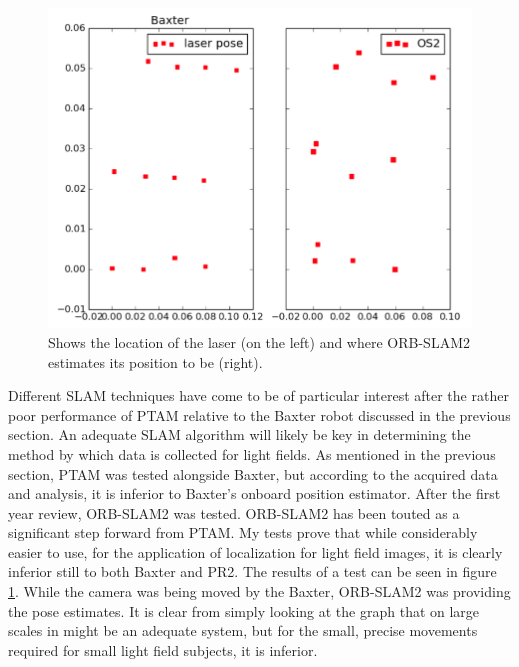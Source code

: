 \documentclass[12pt]{report}
\begin{document}
\begin{figure}[!ht]
	\centering
	\includegraphics[scale=0.45]{os2_and_laser.png}
	\caption{Shows the location of the laser (on the left) and where ORB-SLAM2 estimates its position to be (right).}
	\label{fig:OS2_and_lase}
\end{figure}

Different SLAM techniques have come to be of particular interest after the rather poor performance of PTAM relative to the Baxter robot discussed in the previous section. An adequate SLAM algorithm will likely be key in determining the method by which data is collected for light fields. As mentioned in the previous section, PTAM was tested alongside Baxter, but according to the acquired data and analysis, it is inferior to Baxter's onboard position estimator. After the first year review, ORB-SLAM2 was tested. ORB-SLAM2 has been touted as a significant step forward from PTAM. My tests prove that while considerably easier to use, for the application of localization for light field images, it is clearly inferior still to both Baxter and PR2. The results of a test can be seen in figure \ref{fig:OS2_and_lase}. While the camera was being moved by the Baxter, ORB-SLAM2 was providing the pose estimates. It is clear from simply looking at the graph that on large scales in might be an adequate system, but for the small, precise movements required for small light field subjects, it is inferior.
\end{document}
